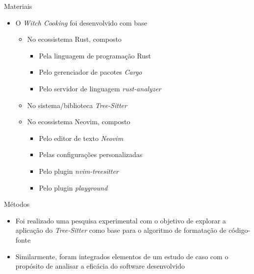 \documentclass
  [ aspectratio=169,
    english,
    hyperref={citecolor=blue,colorlinks=true,linkcolor=blue,urlcolor=blue},
    brazil]
  {beamer}
\newcommand{\treesitter}{\textit{Tree-Sitter}\xspace}
\newcommand{\witchcooking}{\textit{Witch Cooking}\xspace}
\begin{document}
  \begin{frame}{Materiais}
    \begin{itemize}
      \item O \witchcooking foi desenvolvido com base
            \begin{itemize}
              \item No ecossistema Rust, composto
                    \begin{itemize}
                      \item Pela linguagem de programação Rust
                            \cite{rust-2023-rust}
                      \item Pelo gerenciador de pacotes \textit{Cargo}
                            \cite{rust-2023-cargo}
                      \item Pelo servidor de linguagem \textit{rust-analyzer}
                            \cite{rust-analyzer-2023-rust}
                    \end{itemize}
              \item No sistema/biblioteca \treesitter
                    \cite{tree-sitter-2023-tree}
              \item No ecossistema Neovim, composto
                    \begin{itemize}
                      \item Pelo editor de texto \textit{Neovim}
                            \cite{neovim-2023-hyperextensible}
                      \item Pelas configurações personalizadas
                            \cite{silva-2023-uma}
                      \item Pelo plugin \textit{nvim-treesitter}
                            \cite{nvim-treesitter-2023-nvim}
                      \item Pelo plugin \textit{playground}
                            \cite{nvim-treesitter-2023-playground}
                    \end{itemize}
            \end{itemize}
    \end{itemize}
  \end{frame}


  \begin{frame}{Métodos}
    \begin{itemize}
      \item Foi realizado uma pesquisa experimental com o objetivo de explorar
            a aplicação do \treesitter como base para o algoritmo de formatação
            de código-fonte
      \item Similarmente, foram integrados elementos de um estudo de caso com o
            propósito de analisar a eficácia do software desenvolvido
    \end{itemize}
  \end{frame}
\end{document}
